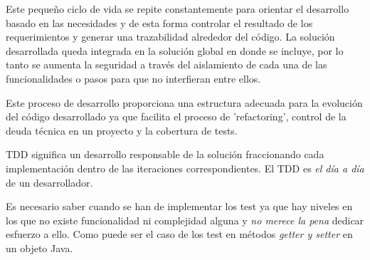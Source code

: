 \par Este pequeño ciclo de vida se repite constantemente para orientar el desarrollo basado en las necesidades y de esta forma controlar el resultado de los requerimientos y generar una trazabilidad alrededor del código. La solución desarrollada queda integrada en la solución global en donde se incluye, por lo tanto se aumenta la seguridad a través del aislamiento de cada una de las funcionalidades o pasos para que no interfieran entre ellos.

\par Este proceso de desarrollo proporciona una estructura adecuada para la evolución del código desarrollado ya que facilita el proceso de 'refactoring', control de la deuda técnica en un proyecto y la cobertura de tests.

\par TDD significa un desarrollo responsable de la solución fraccionando cada implementación dentro de las iteraciones correspondientes. El TDD es \emph{el día a día} de un desarrollador.

\par Es necesario saber cuando se han de implementar los test ya que hay niveles en los que no existe funcionalidad ni complejidad alguna y \emph{no merece la pena} dedicar esfuerzo a ello. Como puede ser el caso de los test en métodos \emph{getter y setter} en un objeto Java.

